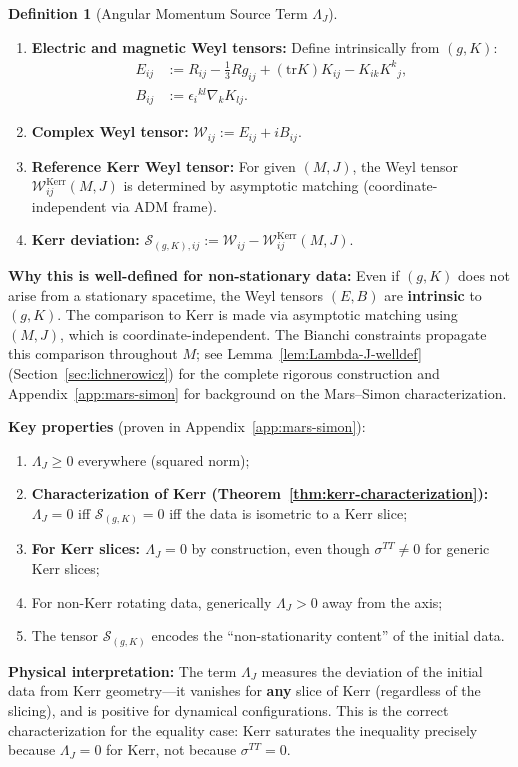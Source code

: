 \documentclass[12pt]{article}
\theoremstyle{plain}
\theoremstyle{definition}
\newtheorem{definition}[theorem]{Definition}
\theoremstyle{remark}
\newcommand{\tr}{\mathrm{tr}}
\begin{document}
\begin{definition}[Angular Momentum Source Term $\Lambda_J$]
\begin{enumerate}[label=\textup{(\roman*)}]
    \item \textbf{Electric and magnetic Weyl tensors:} Define intrinsically from $(g, K)$:
    \begin{align*}
    E_{ij} &:= R_{ij} - \tfrac{1}{3}Rg_{ij} + (\tr K)K_{ij} - K_{ik}K^k{}_j, \\
    B_{ij} &:= \epsilon_i{}^{kl}\nabla_k K_{lj}.
    \end{align*}
    \item \textbf{Complex Weyl tensor:} $\mathcal{W}_{ij} := E_{ij} + iB_{ij}$.
    \item \textbf{Reference Kerr Weyl tensor:} For given $(M, J)$, the Weyl tensor $\mathcal{W}^{\mathrm{Kerr}}_{ij}(M, J)$ is determined by asymptotic matching (coordinate-independent via ADM frame).
    \item \textbf{Kerr deviation:} $\mathcal{S}_{(g,K),ij} := \mathcal{W}_{ij} - \mathcal{W}^{\mathrm{Kerr}}_{ij}(M, J)$.
\end{enumerate}

\textbf{Why this is well-defined for non-stationary data:} Even if $(g, K)$ does not arise from a stationary spacetime, the Weyl tensors $(E, B)$ are \textbf{intrinsic} to $(g, K)$. The comparison to Kerr is made via asymptotic matching using $(M, J)$, which is coordinate-independent. The Bianchi constraints propagate this comparison throughout $M$; see Lemma~\ref{lem:Lambda-J-welldef} (Section~\ref{sec:lichnerowicz}) for the complete rigorous construction and Appendix~\ref{app:mars-simon} for background on the Mars--Simon characterization.

\textbf{Key properties} (proven in Appendix~\ref{app:mars-simon}):
\begin{enumerate}[label=\textup{(\roman*)}]
    \item $\Lambda_J \geq 0$ everywhere (squared norm);
    \item \textbf{Characterization of Kerr (Theorem~\ref{thm:kerr-characterization}):} $\Lambda_J = 0$ iff $\mathcal{S}_{(g,K)} = 0$ iff the data is isometric to a Kerr slice;
    \item \textbf{For Kerr slices: $\Lambda_J = 0$} by construction, even though $\sigma^{TT} \neq 0$ for generic Kerr slices;
    \item For non-Kerr rotating data, generically $\Lambda_J > 0$ away from the axis;
    \item The tensor $\mathcal{S}_{(g,K)}$ encodes the ``non-stationarity content'' of the initial data.
\end{enumerate}

\textbf{Physical interpretation:} The term $\Lambda_J$ measures the deviation of the initial data from Kerr geometry---it vanishes for \textbf{any} slice of Kerr (regardless of the slicing), and is positive for dynamical configurations. This is the correct characterization for the equality case: Kerr saturates the inequality precisely because $\Lambda_J = 0$ for Kerr, not because $\sigma^{TT} = 0$.
\end{definition}
\end{document}
